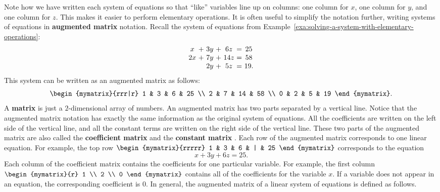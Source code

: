 Note how we have written each system of equations so that ``like''
variables line up on columns: one column for $x$, one column for $y$,
and one column for $z$. This makes it easier to perform elementary
operations. It is often useful to simplify the notation further,
writing systems of equations in \textbf{augmented matrix}%
%
 notation. Recall the
system of equations from Example~\ref{exa:solving-a-system-with-elementary-operations}:
\begin{equation*}
  \begin{array}{c@{~}c@{~}c@{~}c@{~}c@{~}c@{~}c}
    x&+&3y&+&6z&=&25 \\
    2x&+&7y&+&14z&=&58 \\
     &&2y&+&5z&=&19.
  \end{array}
\end{equation*}
This system can be written as an augmented matrix as follows:
\begin{equation*}
  \begin{mymatrix}{rrr|r}
    1 & 3 & 6 & 25 \\
    2 & 7 & 14 & 58 \\
    0 & 2 & 5 & 19
  \end{mymatrix}.
\end{equation*}
A \textbf{matrix}%
 is just a $2$-dimensional array of numbers. An
augmented matrix has two parts separated by a vertical line. Notice
that the augmented matrix notation has exactly the same information as
the original system of equations. All the coefficients are written on
the left side of the vertical line, and all the constant terms are
written on the right side of the vertical line. These two parts of the
augmented matrix are also called the \textbf{coefficient matrix}%
%
 and the \textbf{constant matrix}%
%
.  Each row of the augmented matrix
corresponds to one linear equation. For example, the top row
$\begin{mymatrix}{rrrrr} 1 & 3 & 6 & | & 25
\end{mymatrix}$
corresponds to the equation
\begin{equation*}
  x+3y+6z=25.
\end{equation*}
Each column of the coefficient matrix contains the coefficients
for one particular variable. For example, the first column $\begin{mymatrix}{r}
  1 \\
  2 \\
  0
\end{mymatrix}$ contains all of the coefficients for the variable $x$. If a
variable does not appear in an equation, the corresponding coefficient
is $0$. In general, the augmented matrix of a linear system of
equations is defined as follows.

